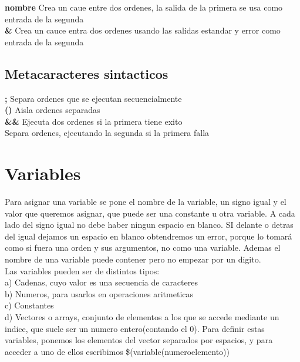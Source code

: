\documentclass[11pt]{article}
\begin{document}
\textbf{\textbar \hspace{0.25cm} nombre} \hspace{2cm}  Crea un caue entre dos ordenes, la salida de la primera se usa como entrada de la segunda \\

\textbf{\textbar \&} \hspace{2cm} Crea un cauce entra dos ordenes usando las salidas estandar y error como entrada de la segunda\\


\subsection { Metacaracteres sintacticos }

\textbf{;} \hspace{2cm} Separa ordenes que se ejecutan secuencialmente\\

\textbf{()} \hspace{2cm} Aisla ordenes separadas\\

\textbf{\&\&} \hspace{2cm} Ejecuta dos ordenes si la primera tiene exito \\

\textbf{\textbar\textbar} \hspace{2cm} Separa ordenes, ejecutando la segunda si la primera falla\\


\section {Variables}

Para asignar una variable se pone el nombre de la variable, un signo igual y el valor que queremos asignar, que puede ser una constante u otra variable. A cada lado del signo igual no debe haber ningun espacio en blanco. SI delante o detras del igual dejamos un espacio en blanco obtendremos un error, porque lo tomará como si fuera una orden y sus argumentos, no como una variable. Ademas el nombre de una variable puede contener pero no empezar por un digito. \\

Las variables pueden ser de distintos tipos: \\
a) Cadenas, cuyo valor es una secuencia de caracteres\\
b) Numeros, para usarlos en operaciones aritmeticas\\
c) Constantes\\
d) Vectores o arrays, conjunto de elementos a los que se accede mediante un indice, que suele ser un numero entero(contando el 0). Para definir estas variables, ponemos los elementos del vector separados por espacios, y para acceder a uno de ellos escribimos \$(variable(numeroelemento))\\
\end{document}
